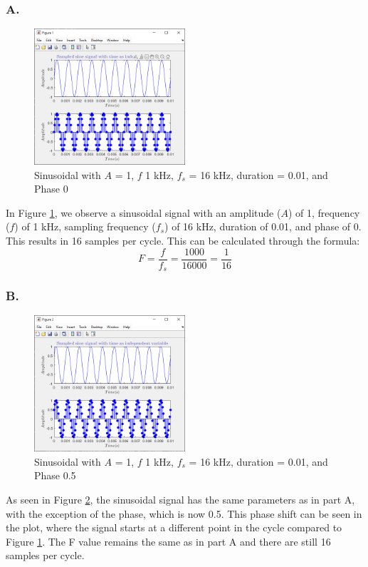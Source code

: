 \documentclass[12pt]{article}
\begin{document}
\subsubsection*{A.}
\begin{figure}[H]
	\centering
	\includegraphics[width=0.5\textwidth]{fig 1a.png}
	\caption{Sinusoidal with $A$ = 1, $f$ 1 kHz, $f_s$ = 16 kHz, duration = 0.01, and Phase 0}
	\label{fig:fig1}
\end{figure}
In Figure \ref{fig:fig1}, we observe a sinusoidal signal with an amplitude ($A$) of 1, 
frequency ($f$) of 1 kHz, sampling frequency ($f_s$) of 16 kHz, duration of 0.01, 
and phase of 0. This results in 16 samples per cycle. This can be calculated through 
the formula:
\[ 
F = \frac{f}{f_s} = \frac{1000}{16000} = \frac{1}{16}
\]

\subsubsection*{B.}

\begin{figure}[H]
	\centering
	\includegraphics[width=0.5\textwidth]{fig 1b.png}
	\caption{Sinusoidal with $A$ = 1, $f$ 1 kHz, $f_s$ = 16 kHz, duration = 0.01, and Phase 0.5}
	\label{fig:fig2}
\end{figure}
As seen in Figure \ref{fig:fig2}, the sinusoidal signal has the same parameters as 
in part A, with the exception of the phase, which is now 0.5. This phase shift can be 
seen in the plot, where the signal starts at a different point in the cycle compared
to Figure \ref{fig:fig1}. The F value remains the same as in part A and there 
are still 16 samples per cycle.
\end{document}
